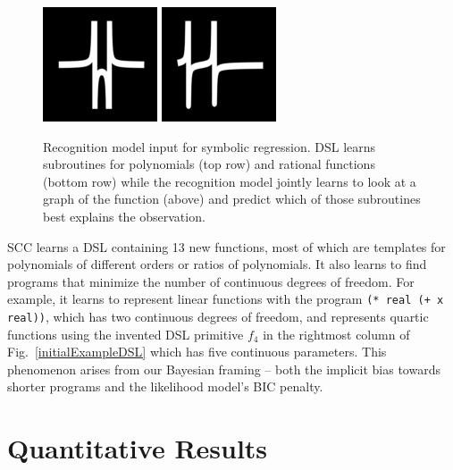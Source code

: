 \documentclass{article}
\newcommand{\system}{\textsc{SCC} }
\newcommand{\code}[1]{{\footnotesize\texttt{#1}}}
\begin{document}
\begin{figure}
  \includegraphics[width = \functionSize]{figures/functions/149.png}
    \includegraphics[width = \functionSize]{figures/functions/187.png}
  \caption{Recognition model input for symbolic regression. DSL learns subroutines for polynomials (top row) and rational functions (bottom row) while the recognition  model jointly learns to look at a graph of the function (above) and predict which of those subroutines best explains the observation.}\label{functions}\vspace{-2cm}
\end{figure}
\system learns a DSL containing 13 new functions,
most of which are templates for polynomials of different orders or ratios of polynomials.
It also learns to find programs that minimize the number of continuous degrees of freedom.
For example, it learns to represent linear functions with the program
\code{(* real (+ x real))}, which has two continuous degrees of freedom, and represents quartic functions using the invented DSL primitive $f_4$ in the rightmost column of Fig.~\ref{initialExampleDSL}
which has five continuous parameters.
This phenomenon arises from our Bayesian framing -- both the implicit bias towards shorter programs and the likelihood model's BIC penalty.


\section{Quantitative Results}\label{quantitative}
\end{document}
